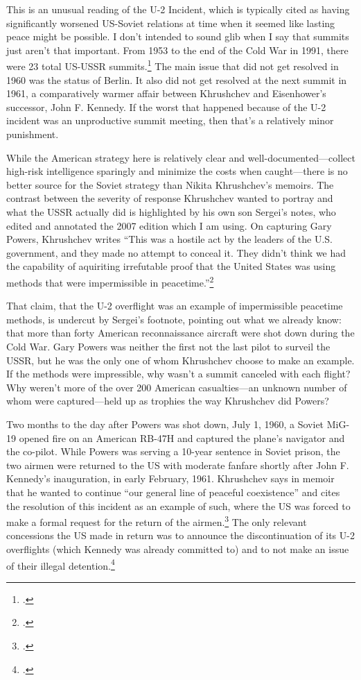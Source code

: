 \documentclass{report}
\begin{document}
\begin{refsegment}
This is an unusual reading of the U-2 Incident, which is typically cited as having significantly worsened US-Soviet relations at time when it seemed like lasting peace might be possible. I don't intended to sound glib when I say that summits just aren't that important. From 1953 to the end of the Cold War in 1991, there were 23 total US-USSR summits.\footcite{fain_chronology_2011} The main issue that did not get resolved in 1960 was the status of Berlin. It also did not get resolved at the next summit in 1961, a comparatively warmer affair between Khrushchev and Eisenhower's successor, John F. Kennedy. If the worst that happened because of the U-2 incident was an unproductive summit meeting, then that's a relatively minor punishment.

While the American strategy here is relatively clear and well-documented---collect high-risk intelligence sparingly and minimize the costs when caught---there is no better source for the Soviet strategy than Nikita Khrushchev's memoirs. The contrast between the severity of response Khrushchev wanted to portray and what the USSR actually did is highlighted by his own son Sergei's notes, who edited and annotated the 2007 edition which I am using.  On capturing Gary Powers, Khrushchev writes ``This was a hostile act by the leaders of the U.S. government, and they made no attempt to conceal it. They didn't think we had the capability of \textelp{} aquiriting irrefutable proof that the United States was using methods that were impermissible in peacetime.''\footcite[p.~239]{khrushchev_memoirs_2007}

That claim, that the U-2 overflight was an example of impermissible peacetime methods, is undercut by Sergei's footnote, pointing out what we already know: that more than forty American reconnaissance aircraft were shot down during the Cold War. Gary Powers was neither the first not the last pilot to surveil the USSR, but he was the only one of whom Khrushchev choose to make an example. If the methods were impressible, why wasn't a summit canceled with each flight?  Why weren't more of the over 200 American casualties---an unknown number of whom were captured---held up as trophies the way Khrushchev did Powers?

Two months to the day after Powers was shot down, July 1, 1960, a Soviet MiG-19 opened fire on an American RB-47H and captured the plane's navigator and the co-pilot. While Powers was serving a 10-year sentence in Soviet prison, the two airmen were returned to the US with moderate fanfare shortly after John F. Kennedy's inauguration, in early February, 1961. Khrushchev says in memoir that he wanted to continue ``our general line of peaceful coexistence'' and cites the resolution of this incident as an example of such, where the US was forced to make a formal request for the return of the airmen.\footcite[p.~256-257]{khrushchev_memoirs_2007} The only relevant concessions the US made in return was to announce the discontinuation of its U-2 overflights (which Kennedy was already committed to) and to not make an issue of their illegal detention.\footcite{time_cold_1961}


\end{refsegment}
\end{document}
